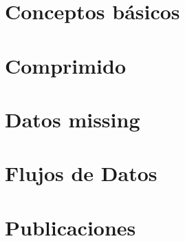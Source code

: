 \section{Conceptos básicos}
\label{sec:clasificacion:conceptos-basicos}







\section{\Catalogo}
\label{sec:clasificacion:catalogo}










\section{\Catalogo Comprimido}
\label{sec:catalogos:catalogo-comprimido}










\section{\CC}
\label{sec:clasificacion:catalogo-completo}







\section{Datos missing}
\label{sec:clasificacion:datos-missing}






\section{Flujos de Datos}
\label{sec:clasificacion:flujos-de-datos}








\section{Publicaciones}
\label{sec:clasificacion:publicaciones}







